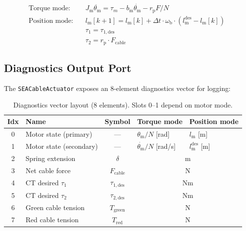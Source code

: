 \documentclass[11pt,a4paper]{article}
\newcommand{\rp}{r_{\mathrm{p}}}
\newcommand{\lm}{l_{\mathrm{m}}}
\newcommand{\wb}{\omega_{\mathrm{b}}}
\newcommand{\Jm}{J_{\mathrm{m}}}
\newcommand{\thetam}{\theta_{\mathrm{m}}}
\begin{document}
\begin{codemath}
\begin{align}
    \text{Torque mode:}\quad & \Jm \ddot{\thetam} = \tau_m - b_{\mathrm{m}} \dot{\thetam} - \rp F / N \tag{rotor EOM} \\
    \text{Position mode:}\quad & \lm[k{+}1] = \lm[k] + \Delta t \cdot \wb \cdot (\lm^{\mathrm{des}} - \lm[k]) \tag{motor servo} \\
    & \tau_1 = \tau_{1,\mathrm{des}} \tag{rigid J1} \\
    & \tau_2 = \rp \cdot F_{\mathrm{cable}} \tag{SEA J2}
\end{align}
\end{codemath}


\subsection{Diagnostics Output Port}

The \texttt{SEACableActuator} exposes an 8-element diagnostics vector for logging:

\begin{table}[H]
\centering
\caption{Diagnostics vector layout (8 elements).  Slots 0--1 depend on motor mode.}
\begin{tabular}{clcll}
\toprule
\textbf{Idx} & \textbf{Name} & \textbf{Symbol} & \textbf{Torque mode} & \textbf{Position mode} \\
\midrule
0 & Motor state (primary)   & --- & $\thetam / N$ [rad] & $\lm$ [m] \\
1 & Motor state (secondary) & --- & $\dot{\thetam} / N$ [rad/s] & $\lm^{\mathrm{des}}$ [m] \\
2 & Spring extension & $\delta$ & \multicolumn{2}{c}{m} \\
3 & Net cable force & $F_{\mathrm{cable}}$ & \multicolumn{2}{c}{N} \\
4 & CT desired $\tau_1$ & $\tau_{1,\mathrm{des}}$ & \multicolumn{2}{c}{Nm} \\
5 & CT desired $\tau_2$ & $\tau_{2,\mathrm{des}}$ & \multicolumn{2}{c}{Nm} \\
6 & Green cable tension & $T_{\mathrm{green}}$ & \multicolumn{2}{c}{N} \\
7 & Red cable tension & $T_{\mathrm{red}}$ & \multicolumn{2}{c}{N} \\
\bottomrule
\end{tabular}
\end{table}


\end{document}
